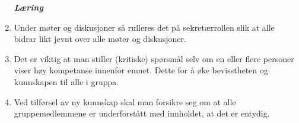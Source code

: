 \begin{enumerate}
{\bf \textit{Læring}}

\item Under møter og diskusjoner så rulleres det på sekretærrollen slik at alle bidrar likt jevnt over alle møter og diskusjoner.

\item Det er viktig at man stiller (kritiske) spørsmål selv om en eller flere personer viser høy kompetanse innenfor emnet. Dette for å øke bevisstheten og kunnskapen til alle i gruppa.

\item Ved tilførsel av ny kunnskap skal man forsikre seg om at alle gruppemedlemmene er underforstått med innholdet, at det er entydig.
\end{enumerate}
